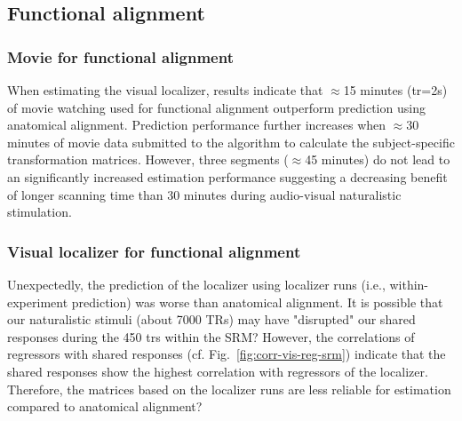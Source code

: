\subsection{Functional alignment}




\subsubsection{Movie for functional alignment}



%
When estimating the visual localizer, results indicate that $\approx$15 minutes
(\ac{tr}=2s) of movie watching used for functional alignment outperform
prediction using anatomical alignment.
%
Prediction performance further increases when $\approx$30 minutes of movie data
submitted to the algorithm to calculate the subject-specific transformation
matrices.
%
However, three segments ($\approx$45 minutes) do not lead to an significantly
increased estimation performance suggesting a decreasing benefit of longer
scanning time than 30 minutes during audio-visual naturalistic stimulation.



\subsubsection{Visual localizer for functional alignment}



%
Unexpectedly, the prediction of the localizer using localizer runs (i.e.,
within-experiment prediction) was worse than anatomical alignment.
%
It is possible that our naturalistic stimuli (about 7000 TRs) may have
"disrupted" our shared responses during the 450 \acp{tr} within the SRM?
%
However, the correlations of regressors with shared responses (cf.
Fig.~\ref{fig:corr-vis-reg-srm}) indicate that the shared responses show the
highest correlation with regressors of the localizer.
%
Therefore, the matrices based on the localizer runs are less reliable for
estimation compared to anatomical alignment?



